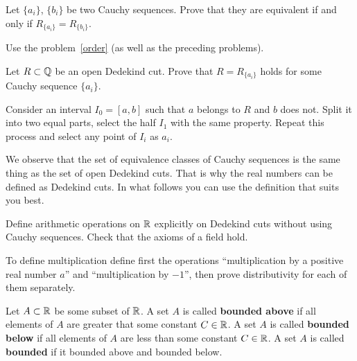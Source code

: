 \documentclass[12pt]{article}
\begin{document}
\begin{zadacha}[*] Let $\{ a_i\}$, $\{b_i\}$ be two Cauchy
  sequences. Prove that they are equivalent if and only if $R_{\{
  a_i\}} = R_{\{ b_i\}}$.
\end{zadacha}

\begin{ukazanie}
Use the problem~\ref{order} (as well as the preceding problems).
\end{ukazanie}

\begin{zadacha}[*]
Let $R \subset {\mathbb Q}$ be an open Dedekind cut. Prove that $R
= R_{\{a_i\}}$ holds for some Cauchy sequence $\{a_i\}$.
\end{zadacha}

\begin{ukazanie}
Consider an interval $I_0=[a,b]$ such that $a$ belongs to $R$ and $b$
does not. Split it into two equal parts, select the half $I_1$ with
the same property. Repeat this process and select any point of $I_i$
as $a_i$.
\end{ukazanie} 

We observe that the set of equivalence classes of Cauchy sequences is
the same thing as the set of open Dedekind cuts. That is why the
real numbers can be defined as Dedekind cuts. In what follows you
can use the definition that suits you best.

\begin{zadacha}[**]
Define arithmetic operations on ${\mathbb R}$ explicitly on Dedekind cuts
without using Cauchy sequences. Check that the axioms of a field hold.
\end{zadacha}

\begin{ukazanie}
To define multiplication define first the operations  ``multiplication
by a positive real number $a$'' and ``multiplication by $-1$'',
then prove distributivity for each of them separately.
\end{ukazanie}


\begin{opredelenie} Let $A\subset {\mathbb R}$ be some subset of
${\mathbb R}$. A set $A$ is called {\bf bounded above} if all elements of
$A$ are greater that some constant $C\in {\mathbb R}$.  A set $A$ is called
{\bf bounded below} if all elements of $A$ are less than some constant
$C\in {\mathbb R}$. A set $A$ is called {\bf bounded} if it bounded above and
bounded below.
\end{opredelenie}
\end{document}
